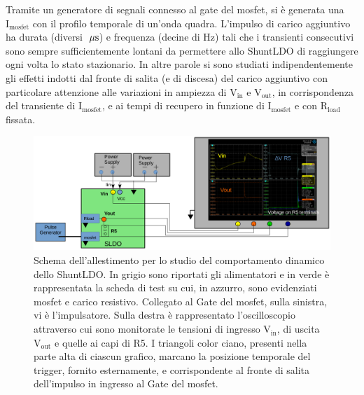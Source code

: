 Tramite un generatore di segnali connesso al gate del mosfet, si \`e generata una $\mathrm{I_{mosfet}}$ con il profilo temporale di un'onda quadra. L'impulso di carico aggiuntivo ha durata (diversi $\; \mu \rm s$) e frequenza (decine di Hz) tali che i transienti consecutivi sono sempre sufficientemente lontani da permettere allo ShuntLDO di raggiungere ogni volta lo stato stazionario. In altre parole si sono studiati indipendentemente gli effetti indotti dal fronte di salita (e di discesa) del carico aggiuntivo con particolare attenzione alle variazioni in ampiezza di $\mathrm{V_{in}}$ e $\mathrm{V_{out}}$, in corrispondenza del transiente di $\mathrm{I_{mosfet}}$, e ai tempi di recupero in funzione di $\mathrm{I_{mosfet}}$ e con $\mathrm{R_{load}}$ fissata.
\begin{figure}[!htb]
\centering
\includegraphics[width=.99\linewidth]{Immagini/SetupScheme}
\caption{Schema dell'allestimento per lo studio del comportamento dinamico dello ShuntLDO. In grigio sono riportati gli alimentatori e in verde è rappresentata la scheda di test su cui, in azzurro, sono evidenziati mosfet e carico resistivo. Collegato al Gate del mosfet, sulla sinistra, vi è l'impulsatore. Sulla destra è rappresentato l'oscilloscopio attraverso cui sono monitorate le tensioni di ingresso $\mathrm{V_{in}}$, di uscita $\mathrm{V_{out}}$ e quelle ai capi di R5. I triangoli color ciano, presenti nella parte alta di ciascun grafico, marcano la posizione temporale del trigger, fornito esternamente, e corrispondente al fronte di salita dell'impulso in ingresso al Gate del mosfet.}
\label{Setupscheme}
\end{figure}

